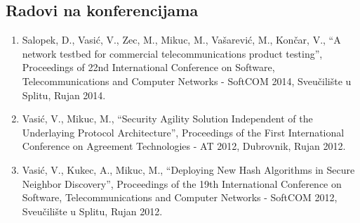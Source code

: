 \subsection*{Radovi na konferencijama}

\begin{enumerate}
\item Salopek, D., Vasić, V., Zec, M., Mikuc, M., Vašarević, M., Končar, V., ``A
    network testbed for commercial telecommunications product testing'',
    Proceedings of 22nd International Conference on Software, Telecommunications
    and Computer Networks - SoftCOM 2014, Sveučilište u Splitu, Rujan 2014.
\item Vasić, V., Mikuc, M., ``Security Agility Solution Independent of the
    Underlaying Protocol Architecture'', Proceedings of the First International
    Conference on Agreement Technologies - AT 2012, Dubrovnik, Rujan 2012.
\item Vasić, V., Kukec, A., Mikuc, M., ``Deploying New Hash Algorithms in Secure
    Neighbor Discovery'', Proceedings of the 19th International Conference on
    Software, Telecommunications and Computer Networks - SoftCOM 2012,
    Sveučilište u Splitu, Rujan 2012.
\end{enumerate}
